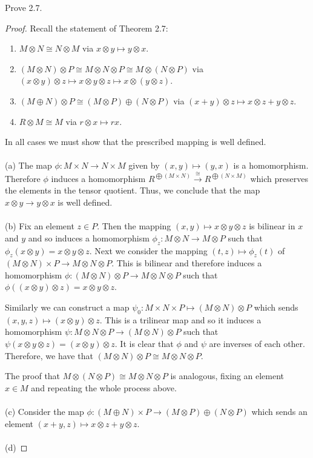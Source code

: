 \newpage
\begin{problem}
Prove 2.7.
\end{problem}
\begin{proof}
Recall the statement of Theorem 2.7:
\begin{theorem*}
\begin{enumerate}[noitemsep,label=(\alph*)]
\item $M\otimes N\cong N\otimes M$ via $x\otimes y\mapsto
  y\otimes x$.
\item $(M\otimes N)\otimes P\cong M\otimes N\otimes
  P\cong M\otimes(N\otimes P)$ via $(x\otimes y)\otimes
  z\mapsto x\otimes y\otimes z\mapsto x\otimes (y\otimes z)$.
\item $(M\oplus N)\otimes P\cong (M\otimes P)\oplus
  (N\otimes P)$ via $(x+y)\otimes z\mapsto x\otimes z+y\otimes
  z$.
\item $R\otimes M\cong M$ via $r\otimes x\mapsto rx$.
\end{enumerate}
\end{theorem*}
\vspace{.25in}
\noindent
In all cases we must show that the prescribed mapping is well
defined.
\\\\
(a) The map $\phi\colon M\times N\to N\times M$ given by
$(x,y)\mapsto(y,x)$ is a homomorphism. Therefore $\phi$ induces a
homomorphism $R^{\bigoplus (M\times
  N)}\overset{\cong}{\longrightarrow}R^{\bigoplus(N\times M)}$
which preserves the elements in the tensor quotient. Thus, we
conclude that the map $x\otimes y\to y\otimes x$ is well
defined.
\\\\
(b) Fix an element $z\in P$. Then the mapping $(x,y)\mapsto
x\otimes y\otimes z$ is bilinear in $x$ and $y$ and so induces a
homomorphism $\phi_z\colon M\otimes N\to M\otimes P$ such
that $\phi_z(x\otimes y)=x\otimes y\otimes z$. Next we consider
the mapping $(t,z)\mapsto\phi_z(t)$ of $(M\otimes N)\times P\to
M\otimes N\otimes P$. This is bilinear and therefore induces a
homomorphism $\phi\colon (M\otimes N)\otimes P\to M\otimes
N\otimes P$ such that $\phi((x\otimes y)\otimes z)=x\otimes
y\otimes z$.

Similarly we can construct a map $\psi_0\colon M\times N\times
P\mapsto (M\otimes N)\otimes P$ which sends $(x,y,z)\mapsto
(x\otimes y)\otimes z$. This is a trilinear map and so it induces
a homomorphism $\psi\colon M\otimes N\otimes P\to(M\otimes
N)\otimes P$ such that $\psi(x\otimes y\otimes z)=(x\otimes
y)\otimes z$. It is clear that $\phi$ and $\psi$ are inverses of
each other. Therefore, we have that $(M\otimes N)\otimes P\cong
M\otimes N\otimes P$.

The proof that $M\otimes (N\otimes P)\cong M\otimes N\otimes P$
is analogous, fixing an element $x\in M$ and repeating the whole
process above.
\\\\
(c) Consider the map $\phi\colon(M\oplus N)\times P\to (M\otimes
P)\oplus (N\otimes P)$ which sends an element $(x+y,z)\mapsto
x\otimes z+y\otimes z$.
\\\\
(d)
\end{proof}
